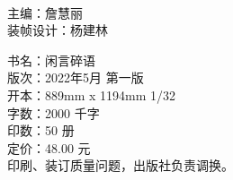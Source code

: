 \documentclass[cn,12pt,twoside]{elegantbook}
\begin{document}
    \thispagestyle{empty}
    
    \thispagestyle{empty}
    \newpage
    \ %
    \thispagestyle{empty}
    \newpage 
    \thispagestyle{empty}
     


\clearpage

\thispagestyle{empty}
\vspace*{\fill}

\begin{flushleft}
    \begingroup
    主\hspace*{2\ccwd}编：詹慧丽\\
    装帧设计：杨建林\\
    \endgroup
\end{flushleft}
\vspace{3em}
 \begin{flushleft}
   \begingroup
   书\hspace*{2\ccwd}名：闲言碎语\\
   版\hspace*{2\ccwd}次：2022年5月 第一版\\
   开\hspace*{2\ccwd}本：889mm x 1194mm  1/32\\
   字\hspace*{2\ccwd}数：2000 千字\\
   印\hspace*{2\ccwd}数：50 册\\
   定\hspace*{2\ccwd}价：48.00 元\\ 
   \vspace{2em}
   印刷、装订质量问题，出版社负责调换。
   \endgroup
 \end{flushleft}


 \clearpage
\thispagestyle{empty}
\vspace*{3em}
\Large{}


\tableofcontents
\thispagestyle{empty}


\mainmatter
\hypersetup{pageanchor=true}



\end{document}
